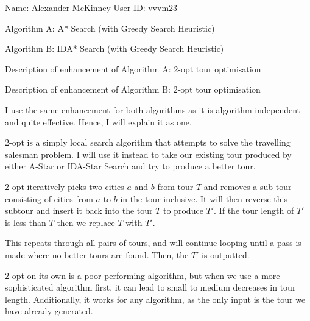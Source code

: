 \documentclass[11pt,a4paper]{article}
\begin{document}
Name: Alexander McKinney \hspace{200pt} User-ID: vvvm23

Algorithm A: A* Search (with Greedy Search Heuristic)

Algorithm B: IDA* Search (with Greedy Search Heuristic)

\vspace{10pt}

Description of enhancement of Algorithm A: 2-opt tour optimisation

Description of enhancement of Algorithm B: 2-opt tour optimisation

\vspace{10pt}

I use the same enhancement for both algorithms as it is algorithm independent and quite effective. Hence, I will explain it as one.

\vspace{5pt}

\noindent\hrulefill

\vspace{5pt}

2-opt is a simply local search algorithm that attempts to solve the travelling salesman problem. I will use it instead to take our existing tour produced by either A-Star or IDA-Star Search and try to produce a better tour.

2-opt iteratively picks two cities $a$ and $b$ from tour $T$ and removes a sub tour consisting of cities from $a$ to $b$ in the tour inclusive. It will then reverse this subtour and insert it back into the tour $T$ to produce $T'$. If the tour length of $T'$ is less than $T$ then we replace $T$ with $T'$.

This repeats through all pairs of tours, and will continue looping until a pass is made where no better tours are found. Then, the $T'$ is outputted.

2-opt on its own is a poor performing algorithm, but when we use a more sophisticated algorithm first, it can lead to small to medium decreases in tour length. Additionally, it works for any algorithm, as the only input is the tour we have already generated.
\end{document}

